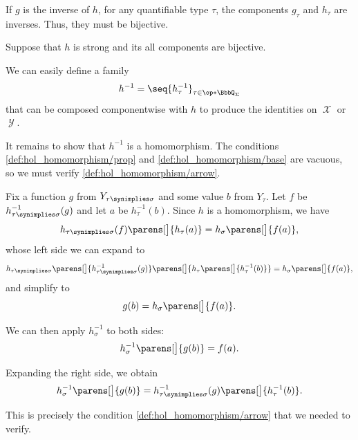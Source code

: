 \begin{defproof}
   If \( g \) is the inverse of \( h \), for any quantifiable type \( \tau \), the components \( g_\tau \) and \( h_\tau \) are inverses. Thus, they must be bijective.

   Suppose that \( h \) is strong and its all components are bijective.

  We can easily define a family
  \begin{equation*}
    h^{-1} = \seq{ h^{-1}_\tau }_{\tau \in \op*{\BbbQ_\Sigma}}
  \end{equation*}
  that can be composed componentwise with \( h \) to produce the identities on \( \mscrX \) or \( \mscrY \).

  It remains to show that \( h^{-1} \) is a homomorphism. The conditions \cref{def:hol_homomorphism/prop} and \cref{def:hol_homomorphism/base} are vacuous, so we must verify \cref{def:hol_homomorphism/arrow}.

  Fix a function \( g \) from \( Y_{\tau \synimplies \sigma} \) and some value \( b \) from \( Y_\tau \). Let \( f \) be \( h^{-1}_{\tau \synimplies \sigma}(g) \) and let \( a \) be \( h^{-1}_\tau(b) \). Since \( h \) is a homomorphism, we have
  \begin{equation*}
    h_{\tau \synimplies \sigma}(f)\parens[\big]{ h_\tau(a) } = h_\sigma\parens[\big]{ f(a) },
  \end{equation*}
  whose left side we can expand to
  \begin{equation*}
    h_{\tau \synimplies \sigma}\parens[\big]{h^{-1}_{\tau \synimplies \sigma}(g)}\parens[\big]{ h_\tau\parens[\big]{ h^{-1}_\tau(b) } } = h_\sigma\parens[\big]{ f(a) },
  \end{equation*}
  and simplify to
  \begin{equation*}
    g(b) = h_\sigma\parens[\big]{ f(a) }.
  \end{equation*}

  We can then apply \( h^{-1}_\sigma \) to both sides:
  \begin{equation*}
    h^{-1}_\sigma\parens[\big]{ g(b) } = f(a).
  \end{equation*}

  Expanding the right side, we obtain
  \begin{equation*}
    h^{-1}_\sigma\parens[\big]{ g(b) } = h^{-1}_{\tau \synimplies \sigma}(g) \parens[\big]{ h^{-1}_\tau(b) }.
  \end{equation*}

  This is precisely the condition \cref{def:hol_homomorphism/arrow} that we needed to verify.
\end{defproof}


